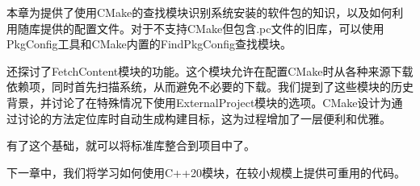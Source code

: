本章为提供了使用CMake的查找模块识别系统安装的软件包的知识，以及如何利用随库提供的配置文件。对于不支持CMake但包含.pc文件的旧库，可以使用PkgConfig工具和CMake内置的FindPkgConfig查找模块。

还探讨了FetchContent模块的功能。这个模块允许在配置CMake时从各种来源下载依赖项，同时首先扫描系统，从而避免不必要的下载。我们提到了这些模块的历史背景，并讨论了在特殊情况下使用ExternalProject模块的选项。CMake设计为通过讨论的方法定位库时自动生成构建目标，这为过程增加了一层便利和优雅。

有了这个基础，就可以将标准库整合到项目中了。

下一章中，我们将学习如何使用C++20模块，在较小规模上提供可重用的代码。